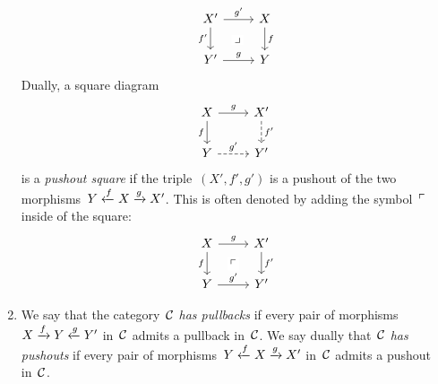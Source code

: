 \begin{remark*}
\begin{enumerate}
      \[
        \begin{tikzcd}
            X'
            \arrow{r}[above]{g'}
            \arrow{d}[left]{f'}
            \arrow[phantom]{dr}[description]{\pb}
          & X
            \arrow{d}[right]{f}
          \\
            Y'
            \arrow{r}[above]{g}
          & Y
        \end{tikzcd}
      \]
      Dually, a square diagram
      \[
        \begin{tikzcd}
            X
            \arrow{r}[above]{g}
            \arrow{d}[left]{f}
          & X'
            \arrow[dashed]{d}[right]{f'}
          \\
            Y
            \arrow[dashed]{r}[above]{g'}
          & Y'
        \end{tikzcd}
      \]
      is a \emph{pushout square} if the triple~$(X', f', g')$ is a pushout of the two morphisms~$Y \xleftarrow{f} X \xrightarrow{g} X'$.
      This is often denoted by adding the symbol~$\ulcorner$ inside of the square:
      \[
        \begin{tikzcd}
            X
            \arrow{r}[above]{g}
            \arrow{d}[left]{f}
            \arrow[phantom]{dr}[description]{\po}
          & X'
            \arrow{d}[right]{f'}
          \\
            Y
            \arrow{r}[above]{g'}
          & Y'
        \end{tikzcd}
      \]
    \item
      We say that the category~$\mathcal{C}$ \emph{has pullbacks} if every pair of morphisms~$X \xrightarrow{f} Y \xleftarrow{g} Y'$ in~$\mathcal{C}$ admits a pullback in~$\mathcal{C}$.
      We say dually that~$\mathcal{C}$ \emph{has pushouts} if every pair of morphisms~$Y \xleftarrow{f} X \xrightarrow{g} X'$ in~$\mathcal{C}$ admits a pushout in~$\mathcal{C}$.
  \end{enumerate}
\end{remark*}


